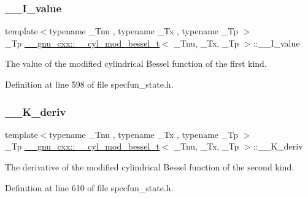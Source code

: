 \subsubsection{\texorpdfstring{\+\_\+\+\_\+\+I\+\_\+value}{\_\_I\_value}}
{\footnotesize\ttfamily template$<$typename \+\_\+\+Tnu , typename \+\_\+\+Tx , typename \+\_\+\+Tp $>$ \\
\+\_\+\+Tp \hyperlink{struct____gnu__cxx_1_1____cyl__mod__bessel__t}{\+\_\+\+\_\+gnu\+\_\+cxx\+::\+\_\+\+\_\+cyl\+\_\+mod\+\_\+bessel\+\_\+t}$<$ \+\_\+\+Tnu, \+\_\+\+Tx, \+\_\+\+Tp $>$\+::\+\_\+\+\_\+\+I\+\_\+value}



The value of the modified cylindrical Bessel function of the first kind. 



Definition at line 598 of file specfun\+\_\+state.\+h.

\mbox{\label{struct____gnu__cxx_1_1____cyl__mod__bessel__t_a8f86a11fb265db76743d80e98be389be}} 
\subsubsection{\texorpdfstring{\+\_\+\+\_\+\+K\+\_\+deriv}{\_\_K\_deriv}}
{\footnotesize\ttfamily template$<$typename \+\_\+\+Tnu , typename \+\_\+\+Tx , typename \+\_\+\+Tp $>$ \\
\+\_\+\+Tp \hyperlink{struct____gnu__cxx_1_1____cyl__mod__bessel__t}{\+\_\+\+\_\+gnu\+\_\+cxx\+::\+\_\+\+\_\+cyl\+\_\+mod\+\_\+bessel\+\_\+t}$<$ \+\_\+\+Tnu, \+\_\+\+Tx, \+\_\+\+Tp $>$\+::\+\_\+\+\_\+\+K\+\_\+deriv}



The derivative of the modified cylindrical Bessel function of the second kind. 



Definition at line 610 of file specfun\+\_\+state.\+h.

\mbox{\label{struct____gnu__cxx_1_1____cyl__mod__bessel__t_a481e4c4537583c461654405c01c25566}} 
